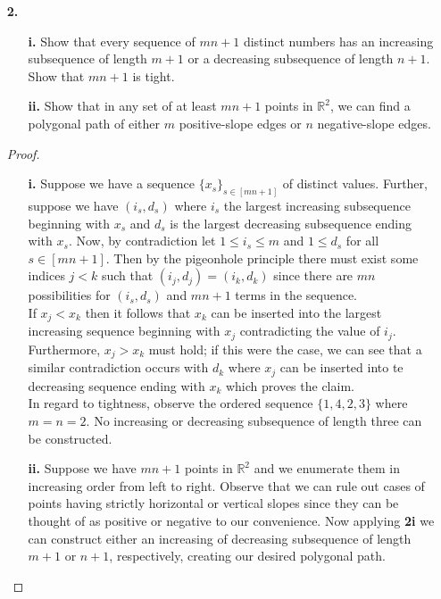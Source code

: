 \documentclass[ 12pt ]{article}
\begin{document}
\begin{enumerate}
	\item[\textbf{2.}]
		\begin{enumerate}
			\item[\textbf{i.}] Show that every sequence of $mn + 1$ distinct numbers has an increasing subsequence of length $m + 1$ or a decreasing subsequence of length $n + 1$.
				Show that $mn + 1$ is tight.
			\item[\textbf{ii.}] Show that in any set of at least $mn + 1$ points in $\mathbb{R}^2$, we can find a polygonal path of either $m$ positive-slope edges or $n$ negative-slope
				edges.
		\end{enumerate}

		\begin{proof}
			\begin{enumerate}
				\item[\textbf{i.}] Suppose we have a sequence $\{ x_s \}_{s \in [mn + 1]}$ of distinct values. Further, suppose we have $(i_s, d_s)$ where $i_s$ the largest increasing
					subsequence beginning with $x_s$ and $d_s$ is the largest decreasing subsequence ending with $x_s$. Now, by contradiction let $1 \leq i_s \leq m$ and $1 \leq d_s$ for
					all $s \in [mn + 1]$. Then by the pigeonhole principle there must exist some indices $j < k$ such that $(i_j, d_j) = (i_k, d_k)$ since there are $mn$ possibilities
					for $(i_s, d_s)$ and $mn + 1$ terms in the sequence. \\
					If $x_j < x_k$ then it follows that $x_k$ can be inserted into the largest increasing sequence beginning with $x_j$ contradicting the value of $i_j$. Furthermore,
					$x_j > x_k$ must hold; if this were the case, we can see that a similar contradiction occurs with $d_k$ where $x_j$ can be inserted into te decreasing sequence
					ending with $x_k$ which proves the claim. \\
					In regard to tightness, observe the ordered sequence $\{ 1, 4, 2, 3 \}$ where $m = n = 2$. No increasing or decreasing subsequence of length three can be constructed.

				\item[\textbf{ii.}] Suppose we have $mn + 1$ points in $\mathbb{R}^2$ and we enumerate them in increasing order from left to right. Observe that we can rule out cases of
					points having strictly horizontal or vertical slopes since they can be thought of as positive or negative to our convenience. Now applying \textbf{2i} we can
					construct either an increasing of decreasing subsequence of length $m+1$ or $n+1$, respectively, creating our desired polygonal path.
			\end{enumerate}
		\end{proof}



\end{enumerate}
\end{document}
